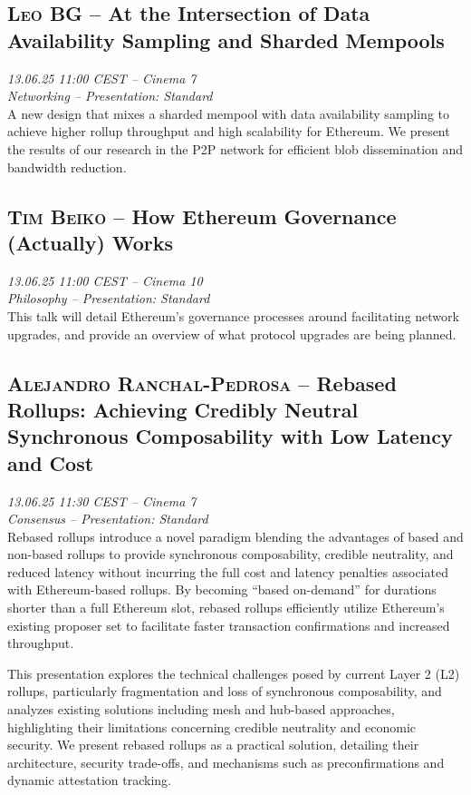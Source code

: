 \clearpage
\subsection {\textsc{Leo BG}  -- At the Intersection of Data Availability Sampling and Sharded Mempools} \noindent \textit {13.06.25 11:00 CEST -- Cinema 7\\ Networking -- Presentation: Standard}\\[1em] A new design that mixes a sharded mempool with data availability sampling to achieve higher rollup throughput and high scalability for Ethereum. We present the results of our research in the P2P network for efficient blob dissemination and bandwidth reduction.

\clearpage
\subsection {\textsc{Tim Beiko}  -- How Ethereum Governance (Actually) Works} \noindent \textit {13.06.25 11:00 CEST -- Cinema 10\\ Philosophy -- Presentation: Standard}\\[1em] This talk will detail Ethereum's governance processes around facilitating network upgrades, and provide an overview of what protocol upgrades are being planned.

\clearpage
\subsection {\textsc{Alejandro Ranchal-Pedrosa}  -- Rebased Rollups: Achieving Credibly Neutral Synchronous Composability with Low Latency and Cost} \noindent \textit {13.06.25 11:30 CEST -- Cinema 7\\ Consensus -- Presentation: Standard}\\[1em] Rebased rollups introduce a novel paradigm blending the advantages of based and non-based rollups to provide synchronous composability, credible neutrality, and reduced latency without incurring the full cost and latency penalties associated with Ethereum-based rollups. By becoming ``based on-demand'' for durations shorter than a full Ethereum slot, rebased rollups efficiently utilize Ethereum’s existing proposer set to facilitate faster transaction confirmations and increased throughput.

This presentation explores the technical challenges posed by current Layer 2 (L2) rollups, particularly fragmentation and loss of synchronous composability, and analyzes existing solutions including mesh and hub-based approaches, highlighting their limitations concerning credible neutrality and economic security. We present rebased rollups as a practical solution, detailing their architecture, security trade-offs, and mechanisms such as preconfirmations and dynamic attestation tracking.

